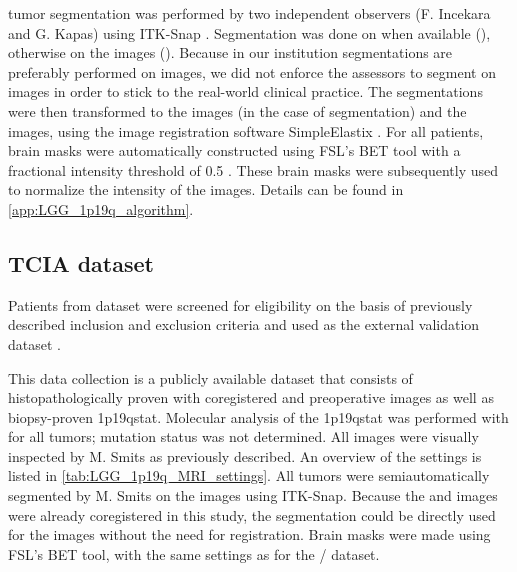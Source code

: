 \Gls{tumor} segmentation was performed by two independent observers (F. Incekara and G. Kapas) using ITK-Snap \autocite{yushkevich2006user}.
Segmentation was done on  when available (), otherwise on the  images ().
Because in our institution  segmentations are preferably performed on  images, we did not enforce the assessors to segment on  images in order to stick to the real-world clinical practice.
The segmentations were then transformed to the  images (in the case of  segmentation) and the  images, using the image registration software SimpleElastix \autocite{marstal2016simpleelastix}.
For all patients, brain masks were automatically constructed using FSL's BET tool with a fractional intensity threshold of \num{0.5} \autocite{smith2002fast}.
These brain masks were subsequently used to normalize the intensity of the  images.
Details can be found in \cref{app:LGG_1p19q_algorithm}.

\subsection{\acrlong{TCIA} dataset}

Patients from   dataset were screened for eligibility on the basis of previously described inclusion and exclusion criteria and used as the external validation dataset \autocite{akkus2017predicting, clark2013cancer, bradley2017radiology}.

This data collection is a publicly available dataset that consists of histopathologically proven  with coregistered  and  preoperative  images as well as biopsy-proven \acl{1p19qstat}.
Molecular analysis of the \acl{1p19qstat} was performed with  for all \glspl{tumor};  mutation status was not determined.
All  images were visually inspected by M. Smits as previously described.
An overview of the  settings is listed in \cref{tab:LGG_1p19q_MRI_settings}.
All \glspl{tumor} were semiautomatically segmented by M. Smits on the  images using ITK-Snap.
Because the  and  images were already coregistered in this study, the segmentation could be directly used for the  images without the need for registration.
Brain masks were made using FSL's BET tool, with the same settings as for the / dataset.



